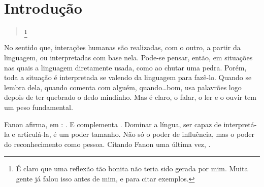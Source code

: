 \chapter{Introdução}
\label{cha:introducao}
\begin{quote}
     
    \footnote{É claro que uma reflexão tão bonita não teria sido gerada por mim. Muita gente já falou isso antes de mim,  e  para citar exemplos.}
\end{quote}
No sentido que, interações humanas são realizadas, com o outro, a partir da linguagem, ou interpretadas com base nela. 
Pode-se pensar, então, em situações nas quais a linguagem  diretamente usada, como ao chutar uma pedra.
Porém, toda a situação é interpretada se valendo da linguagem para fazê-lo. 
Quando se lembra dela, quando comenta com alguém, quando\ldots bom, usa palavrões logo depois de ter quebrado o dedo mindinho. Mas é claro, o falar, o ler e o ouvir tem um peso fundamental.

Fanon afirma, em : . E complementa  . Dominar a língua, ser capaz de interpretá-la e articulá-la, é um poder tamanho. Não só o poder de influência, mas o poder do reconhecimento como pessoa. Citando Fanon uma última vez,  .

